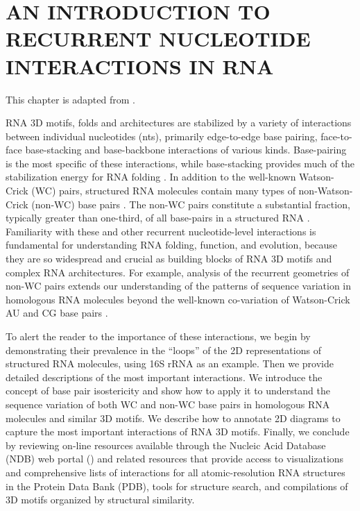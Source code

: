 \chapter{AN INTRODUCTION TO RECURRENT NUCLEOTIDE INTERACTIONS IN RNA}

This chapter is adapted from \cite{Sweeney2014}. 

RNA 3D motifs, folds and architectures are stabilized by a variety of
interactions between individual nucleotides (nts), primarily edge-to-edge base
pairing, face-to-face base-stacking and base-backbone interactions of various
kinds. Base-pairing is the most specific of these interactions, while
base-stacking provides much of the stabilization energy for RNA folding
\cite{Sponer2013}. In addition to the well-known Watson-Crick (WC) pairs,
structured RNA molecules contain many types of non-Watson-Crick (non-WC) base
pairs \cite{Leontis2001}. The non-WC pairs constitute a substantial fraction,
typically greater than one-third, of all base-pairs in a structured RNA
\cite{Stombaugh2009}. Familiarity with these and other recurrent
nucleotide-level interactions is fundamental for understanding RNA folding,
function, and evolution, because they are so widespread and crucial as building
blocks of RNA 3D motifs and complex RNA architectures. For example, analysis of
the recurrent geometries of non-WC pairs extends our understanding of the
patterns of sequence variation in homologous RNA molecules beyond the well-known
co-variation of Watson-Crick AU and CG base pairs \cite{Dutheil2010b,
Leontis2002f}.

To alert the reader to the importance of these interactions, we begin by
demonstrating their prevalence in the ``loops'' of the 2D representations of
structured RNA molecules, using \EC{} 16S rRNA as an example. Then we provide
detailed descriptions of the most important interactions. We introduce the
concept of base pair isostericity and show how to apply it to understand the
sequence variation of both WC and non-WC base pairs in homologous RNA molecules
and similar 3D motifs. We describe how to annotate 2D diagrams to capture the
most important interactions of RNA 3D motifs. Finally, we conclude by reviewing
on-line resources available through the Nucleic Acid Database (NDB) web portal
() and related resources that provide access
to visualizations and comprehensive lists of interactions for all
atomic-resolution RNA structures in the Protein Data Bank (PDB), tools for
structure search, and compilations of 3D motifs organized by structural
similarity. 

